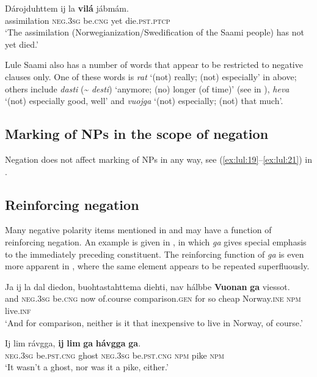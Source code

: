 \documentclass[output=paper,colorlinks,citecolor=brown]{langscibook}
\begin{document}
\ea\label{ex:lul:51} 
    \gll Dárojduhttem ij la \textbf{vilá} jábmám. \\ 
         assimilation \textsc{neg.3sg} be.\textsc{cng} yet die.\textsc{pst.ptcp} \\
    \glt ‘The assimilation (Norwegianization/Swedification of the Saami people) has not yet died.’ \citep{SIKOR2021}
\z 

Lule Saami also has a number of words that appear to be restricted to negative clauses only. One of these words is \textit{rat} ‘(not) really; (not) especially’ in  above; others include \textit{dasti} ({\textasciitilde} \textit{desti}) ‘anymore; (no) longer (of time)’ (see   in ), \textit{heva} ‘(not) especially good, well’ and \textit{vuojga} ‘(not) especially; (not) that much’.

\subsection{Marking of NPs in the scope of negation} \label{sec:lul:4.3}

Negation does not affect marking of NPs in any way, see (\ref{ex:lul:19}--\ref{ex:lul:21}) in .

\subsection{Reinforcing negation} \label{sec:lul:4.4}

Many negative polarity items mentioned in  and  may have a function of reinforcing negation. An example is given in , in which \textit{ga} gives special emphasis to the immediately preceding constituent. The reinforcing function of \textit{ga} is even more apparent in , where the same element appears to be repeated superfluously.

\ea\label{ex:lul:52} 
    \gll Ja ij la dal diedon, buohtastahttema diehti, nav hálbbe \textbf{Vuonan} \textbf{ga} viessot. \\ 
         and \textsc{neg.3sg} be.\textsc{cng} now of.course comparison.\textsc{gen} for so cheap Norway.\textsc{ine} \textsc{npm} live.\textsc{inf} \\
    \glt ‘And for comparison, neither is it that inexpensive to live in Norway, of course.’ \citep{SIKOR2021}
\z 

\ea\label{ex:lul:53} 
    \gll Ij lim rávgga, \textbf{ij} \textbf{lim} \textbf{ga} \textbf{hávgga} \textbf{ga}. \\ 
         \textsc{neg.3sg} be.\textsc{pst.cng} ghost \textsc{neg.3sg} be.\textsc{pst.cng} \textsc{npm} pike \textsc{npm} \\
    \glt ‘It wasn’t a ghost, nor was it a pike, either.’ \citep{SIKOR2021}
\z 
\end{document}
